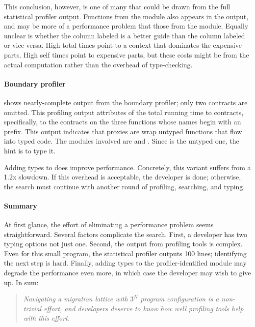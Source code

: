 This conclusion, however, is one of many that could be drawn from the full
statistical profiler output.  Functions from the  module also appears in the output,
and may be more of a performance problem that those from the  module.  Equally
unclear is whether the column labeled  is a better guide than
the column labeled  or vice versa.  High
total times point to a context that dominates the expensive parts.  High self
times point to expensive parts, but these costs might be from the actual
computation rather than the overhead of type-checking.

\paragraph{Boundary profiler}  shows nearly-complete
output from the boundary profiler; only two contracts are omitted.  This
profiling output attributes  of the total running time to
contracts, specifically, to the contracts on the three functions whose names
begin with an  prefix.
This output indicates that proxies are
wrap untyped functions that flow into typed code. The modules involved are
 and .  Since  is the untyped one, the hint is to
type it.

Adding types to  does improve performance. Concretely, this variant
suffers from a 1.2x slowdown.  If this overhead is acceptable, the developer is
done; otherwise, the search must continue with another round of
profiling, searching, and typing.


\paragraph{Summary}

At first glance, the effort of eliminating a performance problem seems
straightforward. Several factors complicate the search. First, a
developer has two typing options not just one. Second, the output from
profiling tools is complex. Even for this small program, the statistical
profiler outputs 100 lines;
identifying the next step is hard. Finally, adding types to the
profiler-identified module may degrade the performance even more, in which case
the developer may wish to give up. In sum:

\begin{quote} \em
Navigating a migration lattice with
$3^N$ program configuration is a non-trivial effort, and developers deserve to
know how well profiling tools help with this effort.
\end{quote}

